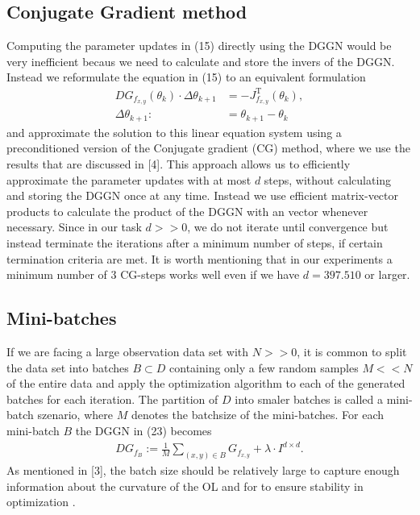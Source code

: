 \documentclass[conference]{IEEEtran}
\begin{document}
	\subsection{Conjugate Gradient method}
	Computing the parameter updates in (15) directly using the DGGN would be very inefficient becaus we need to calculate and store the invers of the DGGN. Instead we reformulate the equation in (15) to an equivalent formulation
	\begin{align}
	DG_{f_{x, y}}(\theta_{k})\cdot\Delta\theta_{k+1} &= -J_{f_{x, y}}^{\mathrm{T}}(\theta_{k}),\\
	\Delta\theta_{k+1} :&= \theta_{k+1} - \theta_{k}
	\end{align}
	and approximate the solution to this linear equation system using a preconditioned version of the Conjugate gradient (CG) method, where we use the results that are discussed in [4]. 
	This approach allows us to efficiently approximate the parameter updates with at most $d$ steps, without calculating and storing the DGGN once at any time. Instead we use efficient matrix-vector products to calculate the product of the DGGN with an vector whenever necessary. Since in our task $d>>0$, we do not iterate until convergence but instead terminate the iterations after a minimum number of steps, if certain termination criteria are met. It is worth mentioning that in our experiments a minimum number of 3 CG-steps works well even if we have $d=397.510$ or larger. 
	
	\subsection{Mini-batches}
	If we are facing a large observation data set with $N>>0$, it is common to split the data set into batches $B\subset D$ containing only a few random samples $M<<N$ of the entire data and apply the optimization algorithm to each of the generated batches for each iteration. The partition of $D$ into smaler batches is called a mini-batch szenario, where $M$ denotes the batchsize of the mini-batches. For each mini-batch $B$ the DGGN in (23) becomes
	\begin{align}
	DG_{f_{B}} := \frac{1}{M}\sum_{(x, y)\in B}^{}G_{f_{x, y}} + \lambda\cdot I^{d\times d}.
	\end{align}
	As mentioned in [3], the batch size should be relatively large to capture enough information about the curvature of the OL and for to ensure stability in optimization . 
	
\end{document}

